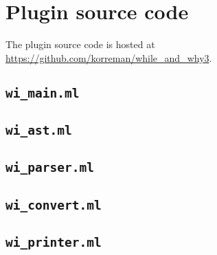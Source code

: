 \section{Plugin source code}
The plugin source code is hosted at \url{https://github.com/korreman/while_and_why3}.
\subsection{\texttt{wi\_main.ml}}

\subsection{\texttt{wi\_ast.ml}}

\subsection{\texttt{wi\_parser.ml}}

\subsection{\texttt{wi\_convert.ml}}

\subsection{\texttt{wi\_printer.ml}}

